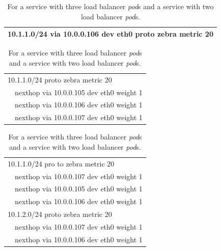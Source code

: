 \begin{table}[h]

  \begin{subtable}{.9\textwidth}
    \centering
    \begin{tabular}{l}
    \hline 
    10.1.1.0/24 via 10.0.0.106 dev eth0 proto zebra metric 20 \\
    \hline
    \end{tabular}
    \caption{With single load balancer {\em pod}.}
    \label{tab:single}
  \end{subtable}

  \par\bigskip

  \begin{subtable}{.9\textwidth}
    \centering
    \begin{tabular}{ll}
      \hline
      \multicolumn{2}{l}{10.1.1.0/24 proto zebra metric 20 } \\
      \hspace{15 mm}
      & nexthop via 10.0.0.105  dev eth0 weight 1 \\
      & nexthop via 10.0.0.106  dev eth0 weight 1 \\
      & nexthop via 10.0.0.107  dev eth0 weight 1 \\
      \hline
    \end{tabular}
    \caption{With three load balancer {\em pod}s.}
    \label{tab:three}
  \end{subtable}
  
  \par\bigskip
  
  \begin{subtable}{.9\textwidth}
    \centering
    \begin{tabular}{ll}
      \hline
      \multicolumn{2}{l}{10.1.1.0/24 pro to zebra metric 20 } \\
      \hspace{15 mm}
      & nexthop via 10.0.0.107  dev eth0 weight 1 \\
      & nexthop via 10.0.0.105  dev eth0 weight 1 \\
      & nexthop via 10.0.0.106  dev eth0 weight 1 \\
      \multicolumn{2}{l}{10.1.2.0/24 proto zebra metric 20 } \\
      \hspace{15 mm}
      & nexthop via 10.0.0.107  dev eth0 weight 1 \\
      & nexthop via 10.0.0.106  dev eth0 weight 1 \\
      \hline
    \end{tabular}
    \centering
    \begin{minipage}{0.8\columnwidth}
    \caption{For a service with three load balancer {\em pod}s and a service with two load balancer {\em pod}s.}
    \label{tab:double_svc}
    \end{minipage}
  \end{subtable}
  

\end{table}
